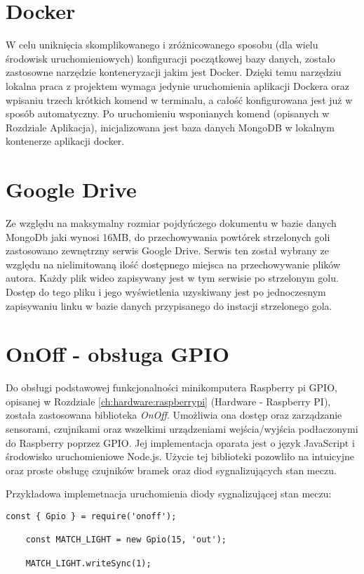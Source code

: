 \label{section:docker}
\section{Docker}
W celu uniknięcia skomplikowanego i zróżnicowanego sposobu (dla wielu środowisk uruchomieniowych) konfiguracji początkowej bazy danych, zostało zastosowne narzędzie konteneryzacji jakim jest Docker. Dzięki temu narzędziu lokalna praca z projektem wymaga jedynie uruchomienia aplikacji Dockera oraz wpisaniu trzech krótkich komend w terminalu, a całość konfigurowana jest już w sposób automatyczny. Po uruchomieniu wsponianych komend (opisanych w Rozdziale Aplikacja), inicjalizowana jest baza danych MongoDB w lokalnym kontenerze aplikacji docker.

\label{section:googleDrive}
\section{Google Drive}
Ze względu na maksymalny rozmiar pojdyńczego dokumentu w bazie danych MongoDb jaki wynosi 16MB, do przechowywania powtórek strzelonych goli zastosowano zewnętrzny serwis Google Drive. Serwis ten został wybrany ze względu na nielimitowaną ilość dostępnego miejsca na przechowywanie plików autora. Każdy plik wideo zapisywany jest w tym serwisie po strzelonym golu. Dostęp do tego pliku i jego wyświetlenia uzyskiwany jest po jednoczesnym zapisywaniu linku w bazie danych przypisanego do instacji strzelonego gola.

\section{OnOff - obsługa GPIO}
Do obsługi podstawowej funkcjonalności minikomputera Raspberry pi GPIO, opisanej w Rozdziale \ref{ch:hardware:raspberrypi} (Hardware - Raspberry PI), została zastosowana biblioteka \textit{OnOff}. Umożliwia ona dostęp oraz zarządzanie sensorami, czujnikami oraz wszelkimi urządzeniami wejścia/wyjścia podłaczonymi do Raspberry poprzez GPIO. Jej implementacja oparata jest o język JavaScript i środowisko uruchomieniowe Node.js. Użycie tej biblioteki pozowliło na intuicyjne oraz proste obsługę czujników bramek oraz diod sygnalizujących stan meczu.

Przykładowa implemetnacja uruchomienia diody sygnalizującej stan meczu:

\begin{lstlisting}[breaklines=true]
    const { Gpio } = require('onoff');

    const MATCH_LIGHT = new Gpio(15, 'out');

    MATCH_LIGHT.writeSync(1);
\end{lstlisting}

